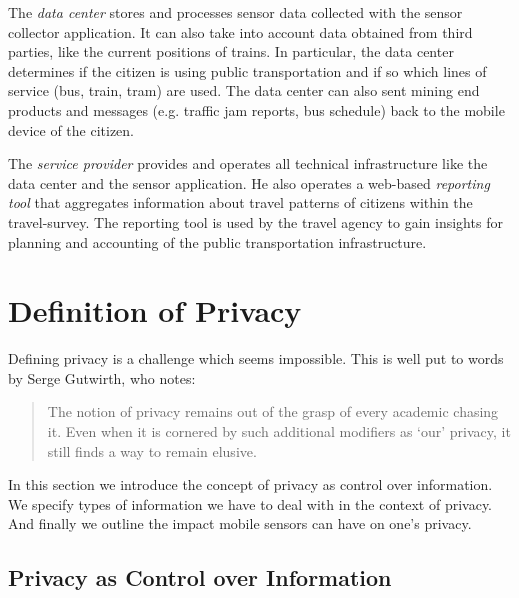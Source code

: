 \documentclass[runningheads,a4paper]{llncs}
\newcommand{\TODO}[1]{\begin{alltt}\textcolor{magenta}{TODO: #1}\end{alltt}}
\begin{document}
The \emph{data center} stores and processes sensor data collected with
the sensor collector application. It can also take into account data
obtained from third parties, like the current positions of trains. In
particular, the data center determines if the citizen is using public
transportation and if so which lines of service (bus, train, tram) are
used. The data center can also sent mining end products and messages
(e.g. traffic jam reports, bus schedule) back to the mobile device of
the citizen.

The \emph{service provider} provides and operates all technical
infrastructure like the data center and the sensor application. He
also operates a web-based \emph{reporting tool} that aggregates
information about travel patterns of citizens within the
travel-survey. The reporting tool is used by the travel agency to gain
insights for planning and accounting of the public transportation
infrastructure.



\section{Definition of Privacy}
\label{sec:privacydef}


\noindent
Defining privacy is a challenge which seems impossible. This is well put to words by Serge Gutwirth, who notes:
\begin{quote}
The notion of privacy remains out of the grasp of every academic chasing it. Even when it is cornered by such additional modifiers as `our' privacy, it still finds a way to remain elusive. \cite{Gutwirth}
\end{quote}
In this section we introduce the concept of privacy as control over information.
We specify types of information we have to deal with in the context of privacy.
And finally we outline the impact mobile sensors can have on one's privacy.

\subsection{Privacy as Control over Information}
\end{document}
